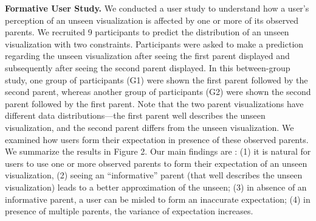 \textbf{Formative User Study.} We conducted a user study to understand how a user's perception of an unseen visualization is affected by one or more of its observed parents. We recruited 9 participants to predict the distribution of an unseen visualization with two constraints. Participants were asked to make a prediction regarding the unseen visualization after seeing the first parent displayed and subsequently after seeing the second parent displayed. In this between-group study, one group of participants (G1) were shown the first parent followed by the second parent, whereas another group of participants (G2) were shown the second parent followed by the first parent. Note that the two parent visualizations have different data distributions---the first parent well describes the unseen visualization, and the second parent differs from the unseen visualization. We examined how users form their expectation in presence of these observed parents. We summarize the results in Figure 2. Our main findings are : (1) it is natural for users to use one or more observed parents to form their expectation of an unseen visualization, (2) seeing an ``informative'' parent (that well describes the unseen visualization) leads to a better approximation of the unseen; (3) in absence of an informative parent, a user can be misled to form an inaccurate expectation; (4) in presence of multiple parents, the variance of expectation increases.
